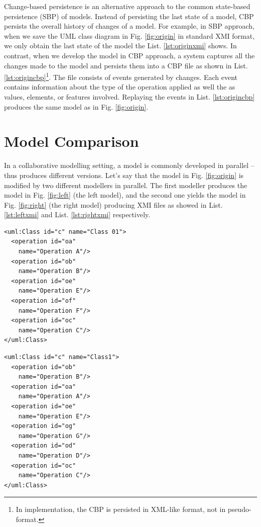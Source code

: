 \documentclass{llncs}
\begin{document}
Change-based persistence is an alternative approach to the common state-based persistence (SBP) of models. Instead of persisting the last state of a model, CBP persists the overall history of changes of a model. For example, in SBP approach, when we save the UML class diagram in Fig. \ref{fig:origin} in standard XMI format, we only obtain the last state of the model the List. \ref{lst:originxmi} shows. In contrast, when we develop the model in CBP approach, a system captures all the changes made to the model and persists them into a CBP file as shown in List. \ref{lst:origincbp}\footnote{In implementation, the CBP is persisted in XML-like format, not in pseudo-format.}. The file consists of events generated by changes. Each event contains information about the type of the operation applied as well the as values, elements, or features involved. Replaying the events in List. \ref{lst:origincbp} produces the same model as in Fig. \ref{fig:origin}.

\section{Model Comparison}
\label{sec:model_comparison}
In a collaborative modelling setting, a model is commonly developed in parallel -- thus produces different versions. Let's say that the model in Fig. \ref{fig:origin} is modified by two different modellers in parallel. The first modeller produces the model in Fig. \ref{fig:left} (the left model), and the second one yields the model in Fig. \ref{fig:right} (the right model) producing XMI files as showed in List. \ref{lst:leftxmi} and List. \ref{lst:rightxmi} respectively.

\begin{minipage}[t]{0.49\linewidth} 
\begin{lstlisting}[style=eol,caption={The simplified XMI of the left model in Fig. \ref{fig:left}.},label=lst:leftxmi]
<uml:Class id="c" name="Class 01">
  <operation id="oa" 
    name="Operation A"/>
  <operation id="ob" 
    name="Operation B"/>
  <operation id="oe" 
    name="Operation E"/>
  <operation id="of" 
    name="Operation F"/>
  <operation id="oc" 
    name="Operation C"/>
</uml:Class>
\end{lstlisting}
\end{minipage}
\hfill
\begin{minipage}[t]{0.49\linewidth}
\begin{lstlisting}[style=eol,caption={The simplified XMI of the right model in Fig. \ref{fig:right}.},label=lst:rightxmi]
<uml:Class id="c" name="Class1">
  <operation id="ob" 
    name="Operation B"/>
  <operation id="oa" 
    name="Operation A"/>
  <operation id="oe" 
    name="Operation E"/>
  <operation id="og" 
    name="Operation G"/>
  <operation id="od" 
    name="Operation D"/>
  <operation id="oc" 
    name="Operation C"/>
</uml:Class>
\end{lstlisting}
\end{minipage}
\end{document}
